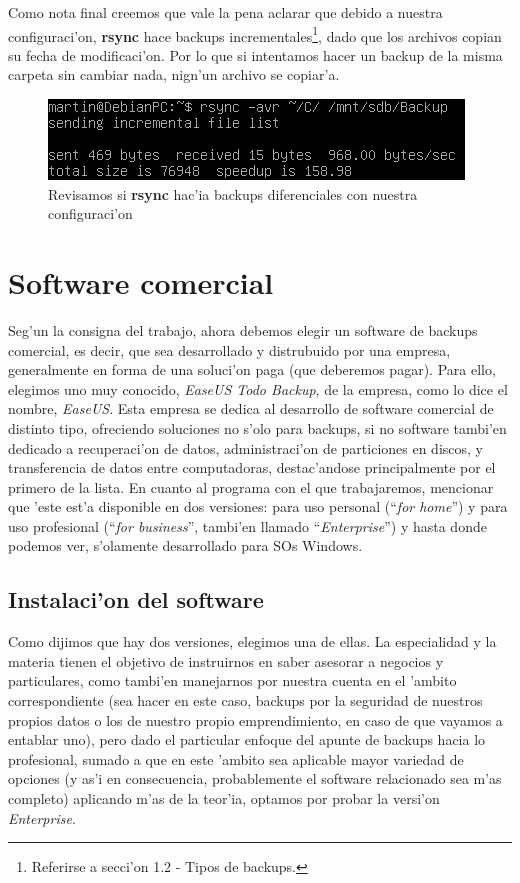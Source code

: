 \documentclass[11pt]{article}
\newcommand{\rsync}[0]{\textbf{rsync}}
\begin{document}
		Como nota final creemos que vale la pena aclarar que debido a nuestra configuraci'on, \rsync{} hace backups incrementales\footnote{Referirse a secci'on 1.2 - Tipos de backups.}, dado que los archivos copian su fecha de modificaci'on. Por lo que si intentamos hacer un backup de la misma carpeta sin cambiar nada, nign'un archivo se copiar'a.

		\begin{figure}[H]
			\centering
			\includegraphics[scale=0.7]{Images/rsync/rsync_backup_incremental.PNG}
			\caption{Revisamos si \rsync{} hac'ia backups diferenciales con nuestra configuraci'on}
			\label{fig:rsync_backup_incremental}
		\end{figure}

	\section{Software comercial}
	Seg'un la consigna del trabajo, ahora debemos elegir un software de backups comercial, es decir, que sea desarrollado y distrubuido por una empresa, generalmente en forma de una soluci'on paga (que deberemos pagar). Para ello, elegimos uno muy conocido, \textit{EaseUS Todo Backup}, de la empresa, como lo dice el nombre, \textit{EaseUS}. Esta empresa se dedica al desarrollo de software comercial de distinto tipo, ofreciendo soluciones no s'olo para backups, si no software tambi'en dedicado a recuperaci'on de datos, administraci'on de particiones en discos, y transferencia de datos entre computadoras, destac'andose principalmente por el primero de la lista. En cuanto al programa con el que trabajaremos, mencionar que 'este est'a disponible en dos versiones: para uso personal (``\textit{for home}'') y para uso profesional (``\textit{for business}'', tambi'en llamado ``\textit{Enterprise}'') y hasta donde podemos ver, s'olamente desarrollado para SOs Windows.
	
	\subsection{Instalaci'on del software}
	Como dijimos que hay dos versiones, elegimos una de ellas. La especialidad y la materia tienen el objetivo de instruirnos en saber asesorar a negocios y particulares, como tambi'en manejarnos por nuestra cuenta en el 'ambito correspondiente (sea hacer en este caso, backups por la seguridad de nuestros propios datos o los de nuestro propio emprendimiento, en caso de que vayamos a entablar uno), pero dado el particular enfoque del apunte de backups hacia lo profesional, sumado a que en este 'ambito sea aplicable mayor variedad de opciones (y as'i en consecuencia, probablemente el software relacionado sea m'as completo) aplicando m'as de la teor'ia, optamos por probar la versi'on \textit{Enterprise}.
	
\end{document}
